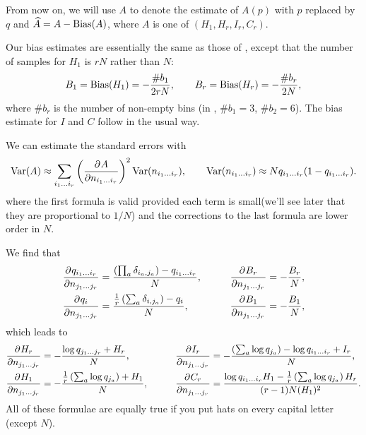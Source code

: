 \documentclass[12pt]{article}
\begin{document}
From now on, we will use $A$ to denote the estimate of $A(p)$ with $p$ replaced by $q$ and $\widehat{A}=A-\operatorname{Bias}(A)$, where $A$ is one of $(H_1,H_r,I_r,C_r)$.

Our bias estimates are essentially the same as those of \cite{Roulston1999}, except that the number of samples for $H_1$ is $rN$ rather than $N$:
%
\begin{equation}\label{eq:biasH}
  B_1 = \operatorname{Bias}(H_1) = -\frac{\#b_1}{2rN},
  \qquad
  B_r = \operatorname{Bias}(H_r) = -\frac{\#b_r}{2N},
\end{equation}
%
where $\#b_r$ is the number of non-empty bins (\eg in , $\#b_1=3$, $\#b_2=6$). The bias estimate for $I$ and $C$ follow in the usual way.

We can estimate the standard errors with
%
\begin{equation}\label{eq:stderr}
  \var(A) \approx \sum_{i_1\ldots i_r} \prn{\pdiff{A}{n_{i_1\ldots i_r}}}^2 \var(n_{i_1\ldots i_r}),
  \qquad
  \var(n_{i_1\ldots i_r}) \approx N q_{i_1\ldots i_r}(1-q_{i_1\ldots i_r}).
\end{equation}
%
where the first formula is valid provided each term is small(we'll see later that they are proportional to $1/N$) and the corrections to the last formula are lower order in $N$.

We find that
%
\begin{equation}\label{eq:dqbydn}
  \begin{aligned}
    \pdiff{q_{i_1\ldots i_r}}{n_{j_1\ldots j_r}} &= \frac{\prn{\prod_a \delta_{i_a,j_a}} - q_{i_1\ldots i_r}}{N}, &
    \qquad
    \pdiff{B_{r}}{n_{j_1\ldots j_r}} &= -\frac{B_r}{N},\\
    \pdiff{q_{i}}{n_{j_1\ldots j_r}} &= \frac{\frac{1}{r} \prn{\sum_a \delta_{i,j_a}} - q_{i}}{N}, &
    \pdiff{B_{1}}{n_{j_1\ldots j_r}} &= -\frac{B_1}{N},
   \end{aligned}
\end{equation}
%
which leads to
%
\begin{equation}\label{eq:dhbydn}
  \begin{aligned}
    \pdiff{H_r}{n_{j_1\ldots j_r}} &= -\frac{\log q_{j_1\ldots j_r} + H_r}{N}, &
    \qquad
    \pdiff{I_{r}}{n_{j_1\ldots j_r}} &= -\frac{\prn{\sum_a \log q_{j_a}}-\log q_{i_1\ldots i_r} + I_r}{N}, \\
    \pdiff{H_1}{n_{j_1\ldots j_r}} &= -\frac{\frac{1}{r} \prn{\sum_a \log q_{j_a}} + H_1}{N}, &
    \pdiff{C_{r}}{n_{j_1\ldots j_r}} &= \frac{\log q_{i_1\ldots i_r} H_1 - \frac{1}{r} \prn{\sum_a \log q_{j_a}} H_r}{(r-1)N(H_1)^2}.
   \end{aligned}
\end{equation}
%
All of these formulae are equally true if you put hats on every capital letter (except $N$).
\end{document}
